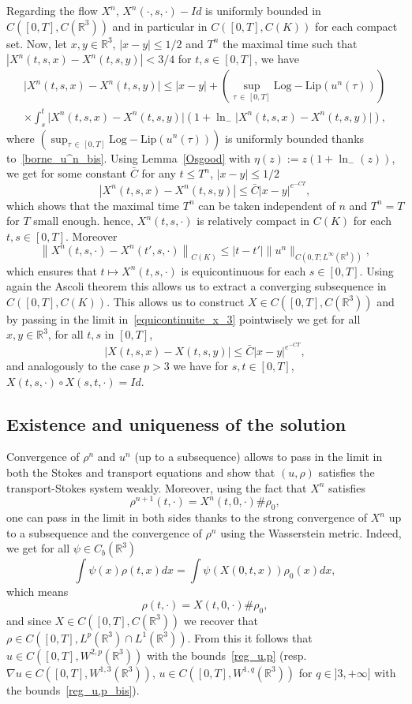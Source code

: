 \documentclass[AHL,Unicode,longabstracts,published]{cedram}
\newcommand{\LLip}{\mathrm{Log-Lip}}
\newcommand{\R}{\mathbb{R}}
\renewcommand{\leq}{\leqslant}
\begin{document}
Regarding the flow $X^n$, $X^n(\cdot,s,\cdot)-Id$ is uniformly bounded in $ C([0,T], C(\R^3))$ and in particular in $ C([0,T], C(K))$ for each compact set. Now, let $x,y \in \R^3$, $|x-y|\leq 1/2$ and $T^n$ the maximal time such that $|X^n(t,s,x)-X^n(t,s,y)|<3/4 $ for $t,s \in[0,T]$, we have
\begin{multline*}
\big|X^n(t,s,x)-X^n(t,s,y)\big|\leq |x-y|+\left(\underset{\tau\,\in\,[0,T]}{\sup}\LLip\left(u^n(\tau)\right) \right) \\
\times \int_s^t \big|X^n(t,s,x)-X^n(t,s,y)\big|\left(1+\ln_{-} \big|X^n(t,s,x)-X^n(t,s,y)\big|\right),
\end{multline*}
where $({\sup}_{\tau\,\in\,[0,T]}\LLip(u^n(\tau)))$ is uniformly bounded thanks to~\eqref{borne_u^n_bis}. Using Lemma~\ref{Osgood} with $\eta(z):=z(1+\ln_{-}(z))$, we get for some constant $\bar C$ for any $t\leq T^n$, $|x-y|\leq1/2$
\begin{equation}\label{equicontinuite_x_3}
\left|X^n(t,s,x)-X^n(t,s,y)\right| \leq \bar{C}|x-y|^{e^{-CT}},
\end{equation}
which shows that the maximal time $T^n$ can be taken independent of $n$ and $T^n=T$ for $T$ small enough. hence, $X^n(t,s,\cdot)$ is relatively compact in $ C(K)$ for each $t,s \in [0,T]$. Moreover
\[
\left\|X^n(t,s,\cdot)-X^n(t',s,\cdot)\right\|_{ C(K)}\leq |t-t'| \| u^n\|_{ C\left(0,T;L^\infty(\R^3)\right)},
\]
which ensures that $t\mapsto X^n(t,s,\cdot) $ is equicontinuous for each $s\in[0,T]$. Using again the Ascoli theorem this allows us to extract a converging subsequence in $ C([0,T], C(K))$. This allows us to construct $X\in C([0,T], C(\R^3))$ and by passing in the limit in~\eqref{equicontinuite_x_3} pointwisely we get for all $x,y \in \R^3$, for all $t,s$ in $[0,T]$,
\[
|X(t,s,x)-X(t,s,y)| \leq \bar{C}|x-y|^{e^{-CT}},
\]
and analogously to the case $p>3$ we have for $s,t\in[0,T]$, $ X(t,s,\cdot) \circ X(s,t,\cdot)= Id. $


\subsection{Existence and uniqueness of the solution}


Convergence of $\rho^n$ and $u^n$ (up to a subsequence) allows to pass in the limit in both the Stokes and transport equations and show that $(u,\rho)$ satisfies the transport-Stokes system weakly. Moreover, using the fact that $X^n $ satisfies
\[
\rho^{n+1}(t,\cdot)= X^n(t,0,\cdot)\#\rho_0,
\]
one can pass in the limit in both sides thanks to the strong convergence of $X^n$ up to a subsequence and the convergence of $\rho^n$ using the Wasserstein metric. Indeed, we get for all $\psi\in C_b(\R^3)$
\[
\int \psi(x) \rho(t,x) dx =\int \psi(X(0,t,x)) \rho_0(x) dx,
\]
which means
\[
\rho(t,\cdot)= X(t,0,\cdot)\# \rho_0,
\]
and since $X\in C([0,T], C(\R^3))$ we recover that $\rho \in C([0,T], L^p(\R^3) \cap L^1(\R^3)) $. From this it follows that $u \in C([0,T], W^{2,p}(\R^3)) $ with the bounds~\eqref{reg_u,p} (resp. $\nabla u \in C([0,T], W^{1,3}(\R^3))$, $u\in C([0,T],W^{1,q}(\R^3)) $ for $q\in]3,+\infty]$ with the bounds~\eqref{reg_u,p_bis}).
\end{document}
